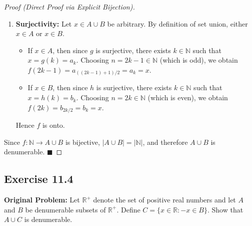 \documentclass[11pt, letterpaper]{article}
\theoremstyle{definition}
\theoremstyle{remark}
\begin{document}
\begin{proof}[Proof (Direct Proof via Explicit Bijection)]
\begin{enumerate}[label=(\arabic*)]
    \item \textbf{Surjectivity:} Let $x \in A \cup B$ be arbitrary. By definition of set union, either $x \in A$ or $x \in B$.
    \begin{itemize}
        \item If $x \in A$, then since $g$ is surjective, there exists $k \in \mathbb{N}$ such that $x = g(k) = a_k$. Choosing $n = 2k - 1 \in \mathbb{N}$ (which is odd), we obtain $f(2k - 1) = a_{((2k-1)+1)/2} = a_k = x$.
        \item If $x \in B$, then since $h$ is surjective, there exists $k \in \mathbb{N}$ such that $x = h(k) = b_k$. Choosing $n = 2k \in \mathbb{N}$ (which is even), we obtain $f(2k) = b_{2k/2} = b_k = x$.
    \end{itemize}
    Hence $f$ is onto.
\end{enumerate}
Since $f : \mathbb{N} \to A \cup B$ is bijective, $|A \cup B| = |\mathbb{N}|$, and therefore $A \cup B$ is denumerable. $\blacksquare$
\end{proof}

\subsection*{Exercise 11.4}
\textbf{Original Problem:} Let $\mathbb{R}^+$ denote the set of positive real numbers and let $A$ and $B$ be denumerable subsets of $\mathbb{R}^+$. Define $C = \{x \in \mathbb{R} : -x \in B\}$. Show that $A \cup C$ is denumerable.
\end{document}
